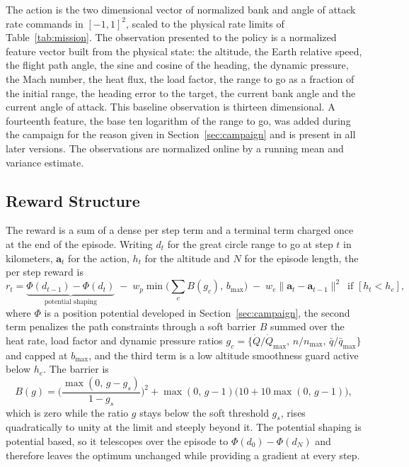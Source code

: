 \documentclass[11pt]{article}
\begin{document}
The action is the two dimensional vector of normalized bank and angle of attack rate commands in $[-1,1]^2$, scaled to the physical rate limits of Table~\ref{tab:mission}. The observation presented to the policy is a normalized feature vector built from the physical state: the altitude, the Earth relative speed, the flight path angle, the sine and cosine of the heading, the dynamic pressure, the Mach number, the heat flux, the load factor, the range to go as a fraction of the initial range, the heading error to the target, the current bank angle and the current angle of attack. This baseline observation is thirteen dimensional. A fourteenth feature, the base ten logarithm of the range to go, was added during the campaign for the reason given in Section~\ref{sec:campaign} and is present in all later versions. The observations are normalized online by a running mean and variance estimate.

\subsection{Reward Structure}
\label{sec:reward}

The reward is a sum of a dense per step term and a terminal term charged once at the end of the episode. Writing $d_t$ for the great circle range to go at step $t$ in kilometers, $\mathbf a_t$ for the action, $h_t$ for the altitude and $N$ for the episode length, the per step reward is
\begin{equation}
r_t = \underbrace{\Phi(d_{t-1}) - \Phi(d_t)}_{\text{potential shaping}}
      \;-\; w_p \min\!\Big(\textstyle\sum_{c} B(g_c),\, b_{\max}\Big)
      \;-\; w_e \lVert \mathbf a_t - \mathbf a_{t-1}\rVert^2 \,\text{ if } [h_t < h_e],
\label{eq:rstep}
\end{equation}
where $\Phi$ is a position potential developed in Section~\ref{sec:campaign}, the second term penalizes the path constraints through a soft barrier $B$ summed over the heat rate, load factor and dynamic pressure ratios $g_c=\{\dot Q/\dot Q_{\max},\,n/n_{\max},\,\bar q/\bar q_{\max}\}$ and capped at $b_{\max}$, and the third term is a low altitude smoothness guard active below $h_e$. The barrier is
\begin{equation}
B(g) = \Big(\frac{\max(0,\,g-g_s)}{1-g_s}\Big)^{2} + \max(0,\,g-1)\big(10 + 10\max(0,\,g-1)\big),
\label{eq:barrier}
\end{equation}
which is zero while the ratio $g$ stays below the soft threshold $g_s$, rises quadratically to unity at the limit and steeply beyond it. The potential shaping is potential based, so it telescopes over the episode to $\Phi(d_0)-\Phi(d_N)$ and therefore leaves the optimum unchanged while providing a gradient at every step.
\end{document}

